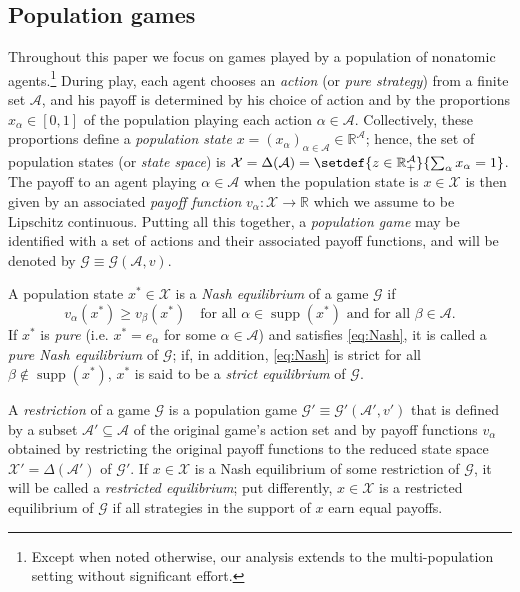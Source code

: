 \documentclass[reqno]{amsart}
\theoremstyle{plain}
\theoremstyle{definition}
\theoremstyle{remark}
\numberwithin{equation}{section}
\numberwithin{theorem}{section}
\begin{document}
\subsection{Population games}
\label{sec:games}

Throughout this paper we focus on games played by a population of nonatomic agents.\footnote{Except when noted otherwise, our analysis extends to the multi-population setting without significant effort.}
During play, each agent chooses an \emph{action} (or \emph{pure strategy}) from a finite set ${\mathcal{A}}$, and his payoff is determined by his choice of action and by the proportions $x_{\alpha}\in[0,1]$ of the population playing each action $\alpha\in{\mathcal{A}}$.
Collectively, these proportions define a \emph{population state} $x = (x_{\alpha})_{\alpha\in{\mathcal{A}}}\in{\mathbb{R}}^{\mathcal{A}}$;
hence, the set of population states (or \emph{state space}) is ${\mathcal{X}} = {\Delta}({\mathcal{A}})=\setdef{z\in{\mathbb{R}}^{\mathcal{A}}_+}{\sum_\alpha x_\alpha =1}$.
The payoff to an agent playing $\alpha\in{\mathcal{A}}$ when the population state is $x\in{\mathcal{X}}$ is then given by an associated \emph{payoff function} ${v}_{\alpha}{\colon} {\mathcal{X}}\to{\mathbb{R}}$ which we assume to be Lipschitz continuous.
Putting all this together, a \emph{population game} may be identified with a set of actions and their associated payoff functions, and will be denoted by ${\mathcal{G}} \equiv {\mathcal{G}}({\mathcal{A}},{v})$.

A population state ${x^{\ast}}\in{\mathcal{X}}$ is a \emph{Nash equilibrium} of a game ${\mathcal{G}}$ if
\begin{equation}
\label{eq:Nash}
\tag{NE}
{v}_{\alpha}({x^{\ast}})
	\geq {v}_{\beta}({x^{\ast}})
	\quad
	\text{for all $\alpha\in\operatorname{supp}({x^{\ast}})$ and for all $\beta\in{\mathcal{A}}$.}
\end{equation}
If ${x^{\ast}}$ is \emph{pure} (i.e. ${x^{\ast}} = {e}_{\alpha}$ for some $\alpha\in{\mathcal{A}}$) and satisfies \eqref{eq:Nash}, it is called a \emph{pure Nash equilibrium} of ${\mathcal{G}}$;
if, in addition, \eqref{eq:Nash} is strict for all $\beta\notin\operatorname{supp}({x^{\ast}})$, ${x^{\ast}}$ is said to be a \emph{strict equilibrium} of ${\mathcal{G}}$.

A \emph{restriction} of a game ${\mathcal{G}}$ is a population game ${\mathcal{G}}' \equiv {\mathcal{G}}'({\mathcal{A}}',{v}')$ that is defined by a subset ${\mathcal{A}}'\subseteq{\mathcal{A}}$ of the original game's action set and by payoff functions ${v}_{\alpha}$ obtained by restricting the original payoff functions to the reduced state space ${\mathcal{X}}' ={\Delta}({\mathcal{A}}')$ of ${\mathcal{G}}'$.
If $x\in{\mathcal{X}}$ is a Nash equilibrium of some restriction of ${\mathcal{G}}$, it will be called a \emph{restricted equilibrium};
put differently, $x \in {\mathcal{X}}$ is a restricted equilibrium of ${\mathcal{G}}$ if all strategies in the support of $x$ earn equal payoffs.
\end{document}
